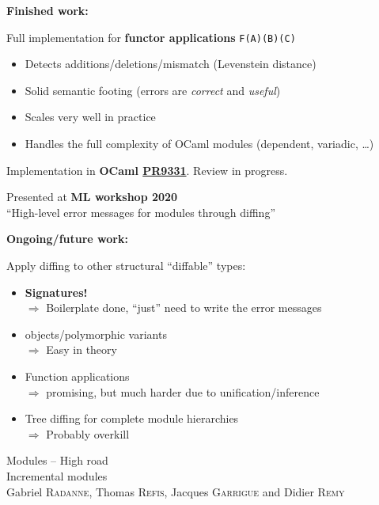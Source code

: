 \documentclass[aspectratio=169,dvipsnames,svgnames,10pt]{beamer}
\begin{document}
\begin{frame}{}
  
  {\Large\bf Finished work:}

  Full implementation for {\bf functor applications} \texttt{F(A)(B)(C)}
  \begin{itemize}
  \item Detects additions/deletions/mismatch (Levenstein distance)
  \item Solid semantic footing (errors are {\it correct} and {\it useful})
  \item Scales very well in practice
  \item Handles the full complexity of OCaml modules (dependent, variadic, \dots)
  \end{itemize}
  
  Implementation in {\bf OCaml \href{https://github.com/ocaml/ocaml/pull/9331}{PR9331}}. Review in progress.
  
  Presented at {\bf ML workshop 2020}\\
  ``High-level error messages for modules through diffing''
\end{frame}


\begin{frame}{}

  {\Large\bf Ongoing/future work:}

  Apply diffing to other structural ``diffable'' types:
  \begin{itemize}
  \item \textbf{Signatures!}\\
    $\Rightarrow$ Boilerplate done, ``just'' need to write the error messages
  \item objects/polymorphic variants\\
    $\Rightarrow$ Easy in theory
  \item Function applications\\
    $\Rightarrow$ promising, but much harder due to unification/inference
  \item Tree diffing for complete module hierarchies\\
    $\Rightarrow$ Probably overkill
  \end{itemize}
\end{frame}

\begin{frame}[t,standout]
  \centering
  \Huge Modules -- High road\\
  \huge Incremental modules\\
  \large Gabriel \textsc{Radanne}, Thomas \textsc{Refis}, Jacques \textsc{Garrigue} and Didier \textsc{Remy}
\end{frame}
\end{document}
